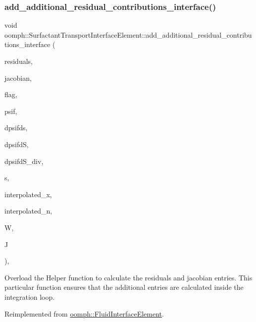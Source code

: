 \subsubsection{\texorpdfstring{add\+\_\+additional\+\_\+residual\+\_\+contributions\+\_\+interface()}{add\_additional\_residual\_contributions\_interface()}}
{\footnotesize\ttfamily void oomph\+::\+Surfactant\+Transport\+Interface\+Element\+::add\+\_\+additional\+\_\+residual\+\_\+contributions\+\_\+interface (\begin{DoxyParamCaption}\item[{\hyperlink{classoomph_1_1Vector}{Vector}$<$ double $>$ \&}]{residuals,  }\item[{\hyperlink{classoomph_1_1DenseMatrix}{Dense\+Matrix}$<$ double $>$ \&}]{jacobian,  }\item[{const unsigned \&}]{flag,  }\item[{const \hyperlink{classoomph_1_1Shape}{Shape} \&}]{psif,  }\item[{const \hyperlink{classoomph_1_1DShape}{D\+Shape} \&}]{dpsifds,  }\item[{const \hyperlink{classoomph_1_1DShape}{D\+Shape} \&}]{dpsifdS,  }\item[{const \hyperlink{classoomph_1_1DShape}{D\+Shape} \&}]{dpsifd\+S\+\_\+div,  }\item[{const \hyperlink{classoomph_1_1Vector}{Vector}$<$ double $>$ \&}]{s,  }\item[{const \hyperlink{classoomph_1_1Vector}{Vector}$<$ double $>$ \&}]{interpolated\+\_\+x,  }\item[{const \hyperlink{classoomph_1_1Vector}{Vector}$<$ double $>$ \&}]{interpolated\+\_\+n,  }\item[{const double \&}]{W,  }\item[{const double \&}]{J }\end{DoxyParamCaption})\hspace{0.3cm}{\ttfamily [protected]}, {\ttfamily [virtual]}}



Overload the Helper function to calculate the residuals and jacobian entries. This particular function ensures that the additional entries are calculated inside the integration loop. 



Reimplemented from \hyperlink{classoomph_1_1FluidInterfaceElement_a0bc278bb201b861f47dc846453be4c06}{oomph\+::\+Fluid\+Interface\+Element}.



